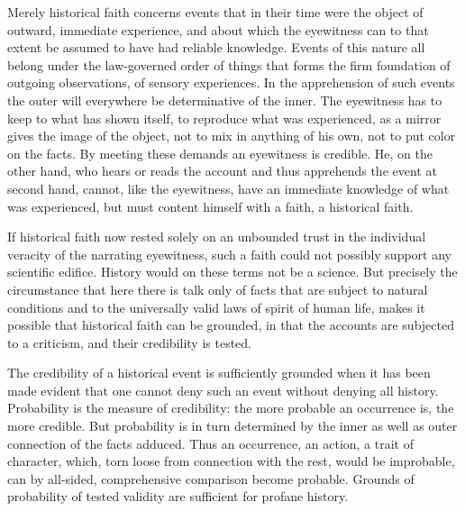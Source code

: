 \documentclass[12pt,a4paper,openany]{book}
\newcommand{\opage}[1]{\marginnote{\footnotesize\textit{[#1]}}}
\begin{document}
Merely historical faith concerns events that
in their time were the object of outward, immediate
experience, and about which the eyewitness can to that extent
be assumed to have had reliable knowledge. Events
of this nature all belong under the law-governed
order of things that forms the firm foundation of outgoing observations,
of sensory experiences. In the
apprehension of such events the outer will everywhere
be determinative of the inner. The eyewitness has to
keep to what has shown itself, to reproduce what was experienced,
as a mirror gives the image of the object, not
to mix in anything of his own, not to put color on
the facts. By meeting these demands
an eyewitness is credible. He, on the other hand, who hears
or reads the account and thus apprehends the event
at second hand, cannot, like the eyewitness,
have an immediate knowledge of what was experienced, but must
content himself with a faith, a historical faith.

If historical faith now rested solely
on an unbounded trust in the individual veracity of the narrating
eyewitness, such a faith could not possibly
support any scientific edifice. History
would on these terms not be a science.
\setcounter{footnote}{0}%
\opage{315}But precisely the circumstance that here there is talk only of
facts that are subject to natural conditions and to the
universally valid laws of spirit of human life, makes it
possible that historical faith can be grounded, in that the accounts
are subjected to a criticism, and their credibility
is tested.

The credibility of a historical event is sufficiently
grounded when it has been made evident that
one cannot deny such an event without
denying all history. Probability is the measure of credibility:
the more probable an occurrence is, the more
credible. But probability is in turn determined by
the inner as well as outer connection of the facts adduced. Thus an occurrence, an action, a
trait of character, which, torn loose from connection with the
rest, would be improbable, can by all-sided, comprehensive
comparison become probable. Grounds of probability
of tested validity are sufficient for profane
history.
\end{document}
